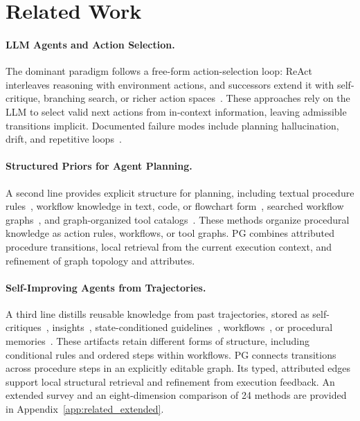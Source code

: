 \section{Related Work}
\label{sec:related_works}
\paragraph{LLM Agents and Action Selection.}
The dominant paradigm follows a free-form action-selection loop: ReAct~\citep{yao2023react} interleaves reasoning with environment actions, and successors extend it with self-critique, branching search, or richer action spaces~\citep{shinn2023reflexion,yao2023tree,wang2024executable,qin2024toolllm}. These approaches rely on the LLM to select valid next actions from in-context information, leaving admissible transitions implicit. Documented failure modes include planning hallucination, drift, and repetitive loops~\citep{zhu2025knowagent,xiao2024flowbench}.

\paragraph{Structured Priors for Agent Planning.} A second line provides explicit structure for planning, including textual procedure rules~\citep{zhu2025knowagent}, workflow knowledge in text, code, or flowchart form~\citep{xiao2024flowbench}, searched workflow graphs~\citep{zhang2025aflow}, and graph-organized tool catalogs~\citep{liu2024toolnet,liu2024controlllm,lumer2025graph}. These methods organize procedural knowledge as action rules, workflows, or tool graphs. PG combines attributed procedure transitions, local retrieval from the current execution context, and refinement of graph topology and attributes.

\paragraph{Self-Improving Agents from Trajectories.} A third line distills reusable knowledge from past trajectories, stored as self-critiques~\citep{shinn2023reflexion}, insights~\citep{zhao2024expel}, state-conditioned guidelines~\citep{fu2024autoguide}, workflows~\citep{wang2025agent}, or procedural memories~\citep{fang2025memp,zhong2024memorybank}. These artifacts retain different forms of structure, including conditional rules and ordered steps within workflows. PG connects transitions across procedure steps in an explicitly editable graph. Its typed, attributed edges support local structural retrieval and refinement from execution feedback. An extended survey and an eight-dimension comparison of 24 methods are provided in Appendix~\ref{app:related_extended}.

